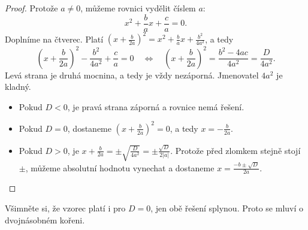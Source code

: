 \begin{proof}
  Protože $a\neq 0$, můžeme rovnici vydělit číslem $a$:
  \begin{equation*}
    x^2 + \frac{b}{a}x + \frac{c}{a} = 0.
  \end{equation*}
  Doplníme na čtverec. Platí ${\left(x + \frac{b}{2a}\right)}^2 = x^2 + \frac{b}{a}x + \frac{b^2}{4a^2}$, a tedy
  \begin{equation*}
    {\left(x + \frac{b}{2a}\right)}^2 - \frac{b^2}{4a^2} + \frac{c}{a} = 0\quad\Leftrightarrow\quad {\left(x + \frac{b}{2a}\right)}^2 = \frac{b^2 - 4ac}{4a^2} = \frac{D}{4a^2}.
  \end{equation*}
  Levá strana je druhá mocnina, a tedy je vždy nezáporná. Jmenovatel $4a^2$ je kladný.
  \begin{itemize}
    \item Pokud $D < 0$, je pravá strana záporná a rovnice nemá řešení.
    \item Pokud $D = 0$, dostaneme ${\left(x + \frac{b}{2a}\right)}^2 = 0$, a tedy $x = -\frac{b}{2a}$.
    \item Pokud $D > 0$, je $x + \frac{b}{2a} = \pm\sqrt{\frac{D}{4a^2}} = \pm\frac{\sqrt{D}}{2|a|}$. Protože před zlomkem stejně stojí $\pm$, můžeme absolutní hodnotu vynechat a dostaneme $x = \frac{-b\pm\sqrt{D}}{2a}$.
  \end{itemize}
\end{proof}

Všimněte si, že vzorec platí i pro $D = 0$, jen obě řešení splynou. Proto se mluví o dvojnásobném kořeni.

